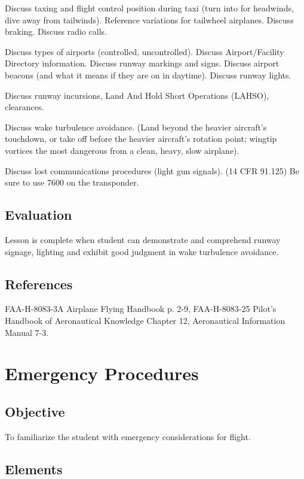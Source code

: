 \documentclass[twoside,openright]{report}
\begin{document}
Discuss taxing and flight control position during taxi (turn into for
headwinds, dive away from tailwinds). Reference variations for tailwheel
airplanes. Discuss braking. Discuss radio calls.

Discuss types of airports (controlled, uncontrolled). Discuss Airport/Facility
Directory information. Discuss runway markings and signs. Discuss airport
beacons (and what it means if they are on in daytime). Discuss runway lights.

Discuss runway incursions, Land And Hold Short Operations (LAHSO), clearances.

Discuss wake turbulence avoidance. (Land beyond the heavier aircraft’s
touchdown, or take off before the heavier aircraft’s rotation point; wingtip
vortices the most dangerous from a clean, heavy, slow airplane).

Discuss lost communications procedures (light gun signals). (14 CFR 91.125) Be
sure to use 7600 on the transponder.

\section{Evaluation}

Lesson is complete when student can demonstrate and comprehend runway signage,
lighting and exhibit good judgment in wake turbulence avoidance.

\section{References}

FAA-H-8083-3A Airplane Flying Handbook p. 2-9, FAA-H-8083-25 Pilot's Handbook
of Aeronautical Knowledge Chapter 12, Aeronautical Information Manual 7-3.

\chapter{Emergency Procedures}

\section{Objective}

To familiarize the student with emergency considerations for flight.

\section{Elements}
\end{document}

